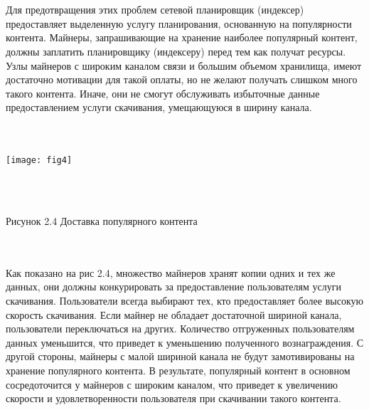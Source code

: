 \documentclass[10pt,a4paper]{article}
\begin{document}
\vspace{-0.5em}
\\ \\Для предотвращения этих проблем сетевой планировщик (индексер) предоставляет выделенную услугу планирования, основанную на популярности контента. Майнеры, запрашивающие на хранение наиболее популярный контент, должны заплатить планировщику (индексеру) перед тем как получат ресурсы. Узлы майнеров с широким каналом связи и большим объемом хранилища, имеют достаточно мотивации для такой оплаты, но не желают получать слишком много такого контента. Иначе, они не смогут обслуживать избыточные данные предоставлением услуги скачивания, умещающуюся в ширину канала.
\vspace{-0.7em}
 \\ \\\\
\centerline{\texttt{[image: fig4]}}
\\\\\centerline{{Рисунок 2.4 Доставка популярного контента}}
\vspace{-1.5em}
\\ \\ Как показано на рис 2.4, множество майнеров хранят копии одних и тех же данных, они должны конкурировать за предоставление пользователям услуги скачивания. Пользователи всегда выбирают тех, кто предоставляет более высокую скорость скачивания. Если майнер не обладает достаточной шириной канала, пользователи переключаться на других. Количество отгруженных пользователям данных уменьшится, что приведет к уменьшению полученного вознаграждения. С другой стороны, майнеры с малой шириной канала не будут замотивированы на хранение популярного контента. В результате, популярный контент в основном сосредоточится у майнеров с широким каналом, что приведет к увеличению скорости и удовлетворенности пользователя при скачивании такого контента.
\vspace{-0.5em}
\end{document}
